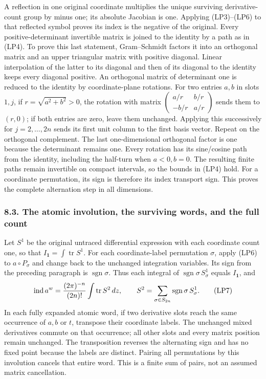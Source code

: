 \documentclass[
  11pt,
]{article}
\begin{document}
A reflection in one original coordinate multiplies the unique surviving
derivative-count group by minus one; its absolute Jacobian is one.
Applying (LP3)--(LP6) to that reflected symbol proves its index is the
negative of the original. Every positive-determinant invertible matrix
is joined to the identity by a path as in (LP4). To prove this last
statement, Gram--Schmidt factors it into an orthogonal matrix and an
upper triangular matrix with positive diagonal. Linear interpolation of
the latter to its diagonal and then of its diagonal to the identity
keeps every diagonal positive. An orthogonal matrix of determinant one
is reduced to the identity by coordinate-plane rotations. For two
entries \(a,b\) in slots \(1,j\), if \(r=\sqrt{a^2+b^2}>0\), the
rotation with matrix \(\begin{pmatrix}a/r&b/r\\-b/r&a/r\end{pmatrix}\)
sends them to \((r,0)\); if both entries are zero, leave them unchanged.
Applying this successively for \(j=2,\ldots,2n\) sends its first unit
column to the first basis vector. Repeat on the orthogonal complement.
The last one-dimensional orthogonal factor is one because the
determinant remains one. Every rotation has its sine/cosine path from
the identity, including the half-turn when \(a<0,b=0\). The resulting
finite paths remain invertible on compact intervals, so the bounds in
(LP4) hold. For a coordinate permutation, its sign is therefore its
index transport sign. This proves the complete alternation step in all
dimensions.

\subsubsection{8.3. The atomic involution, the surviving words, and the
full
count}\label{the-atomic-involution-the-surviving-words-and-the-full-count}

Let \(S^1\) be the original untraced differential expression with each
coordinate count one, so that \(I_{\mathbf1}=\int\operatorname{tr}S^1\).
For each coordinate-label permutation \(\sigma\), apply (LP6) to
\(a\circ P_\sigma\) and change back to the unchanged integration
variables. Its sign from the preceding paragraph is
\(\operatorname{sgn}\sigma\). Thus each integral of
\(\operatorname{sgn}\sigma\,S^1_\sigma\) equals \(I_{\mathbf1}\), and \[
 \operatorname{ind}a^w={ (2\pi)^{-n}\over(2n)!}
       \int\operatorname{tr} S^2\,dz,
 \qquad S^2=\sum_{\sigma\in S_{2n}}
                  \operatorname{sgn}\sigma\,S^1_\sigma.
 \tag{LP7}
\] In each fully expanded atomic word, if two derivative slots reach the
same occurrence of \(a,b\) or \(t\), transpose their coordinate labels.
The unchanged mixed derivatives commute on that occurrence; all other
slots and every matrix position remain unchanged. The transposition
reverses the alternating sign and has no fixed point because the labels
are distinct. Pairing all permutations by this involution cancels that
entire word. This is a finite sum of pairs, not an assumed matrix
cancellation.
\end{document}
